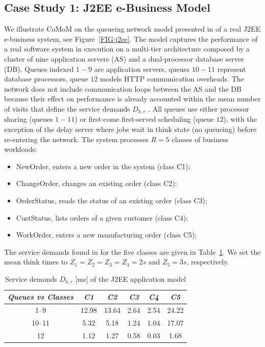 \documentclass[journal,twocolumn,9.5pt]{IEEEtran}
\begin{document}
\subsection{Case Study 1: J2EE e-Business Model}
We illustrate CoMoM on the queueing network model presented in \cite{KouB03} of a real J2EE e-business system, see Figure~\ref{FIG:j2ee}. The model captures the performance of a real software system in execution on a multi-tier architecture composed by a cluster of nine application servers (AS) and a dual-processor database server (DB). Queues indexed $1-9$ are application servers, queues $10-11$ represent database processors, queue $12$ models HTTP communication overheads. The network does not include communication loops between the AS and the DB because their effect on performance is already accounted within the mean number of visits that define the service demands $D_{k,r}$ \cite{KouB03,LazZGS84}. All queues use either processor sharing (queues $1-11$) or first-come first-served  scheduling (queue $12$), with the exception of the delay server where jobs wait in think state (no queueing) before re-entering the network. The system processes $R=5$ classes of business workloads:
\begin{itemize}
\item {\sf NewOrder}, enters a new order in the system (class C1);
\item {\sf ChangeOrder}, changes an existing order (class C2);
\item  {\sf OrderStatus}, reads the status of an existing order (class C3);
\item  {\sf CustStatus},  lists orders of a given customer (class C4);
\item  {\sf WorkOrder}, enters a new manufacturing order (class C5);
\end{itemize}
 The service demands found in \cite{KouB03} for the five classes are given in Table~\ref{TAB:casestudy}.  We set the mean think times to $Z_1=Z_2=Z_3=Z_4=2s$ and $Z_5=3s$, respectively.
\begin{table}[ht]
\centering
\caption{Service demands  $D_{k,r}$ [ms] of the J2EE application model}
\label{TAB:casestudy}
\begin{tabular}{|c|cc ccc|}
\hline
\emph{\textrm{Queues} vs {\rm Classes}} & \emph{C1} &\emph{C2} &\emph{C3} &\emph{C4} &\emph{C5} \\
   \hline
1--9 &12.98 & 13.64 & 2.64 & 2.54 & 24.22 \\
10--11 & 5.32 & 5.18 & 1.24 & 1.04 & 17.07 \\
12& 1.12 & 1.27 & 0.58 & 0.03 & 1.68 \\
\hline
\end{tabular}
\end{table}
\end{document}
